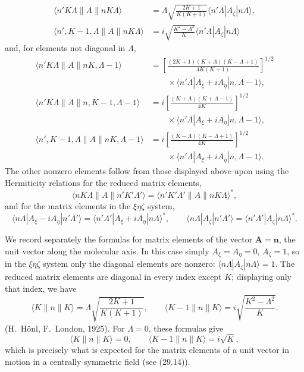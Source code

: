 
\begin{equation}
\begin{split}
\langle n'K\Lambda\|A\|nK\Lambda\rangle&=\Lambda\sqrt{\frac{2K+1}{K(K+1)}}\langle n'\Lambda|A_\zeta|n\Lambda\rangle,\\
\langle n',K-1,\Lambda\|A\|nK\Lambda\rangle&=i\sqrt{\frac{K^2-\Lambda^2}{K}}\langle n'\Lambda|A_\zeta|n\Lambda\rangle
\end{split}
\tag{87.2}
\end{equation}
and, for elements not diagonal in $\Lambda$,
\begin{equation}
\begin{split}
\langle n'K\Lambda\|A\|nK,\Lambda-1\rangle
&=\left[\frac{(2K+1)(K+\Lambda)(K-\Lambda+1)}{4K(K+1)}\right]^{1/2}\\[-2pt]
&\qquad\times\langle n'\Lambda|A_\xi+iA_\eta|n,\Lambda-1\rangle,\\
\langle n'K\Lambda\|A\|n,K-1,\Lambda-1\rangle
&=i\left[\frac{(K+\Lambda)(K+\Lambda-1)}{4K}\right]^{1/2}\\[-2pt]
&\qquad\times\langle n'\Lambda|A_\xi+iA_\eta|n,\Lambda-1\rangle,\\
\langle n',K-1,\Lambda\|A\|nK,\Lambda-1\rangle
&=i\left[\frac{(K-\Lambda)(K-\Lambda+1)}{4K}\right]^{1/2}\\[-2pt]
&\qquad\times\langle n'\Lambda|A_\xi+iA_\eta|n,\Lambda-1\rangle.
\end{split}
\tag{87.3}
\end{equation}
The other nonzero elements follow from those displayed above upon using the Hermiticity relations for the reduced matrix elements,
\[
\langle nK\Lambda\|A\|n'K'\Lambda'\rangle=\langle n'K'\Lambda'\|A\|nK\Lambda\rangle^*,
\]
and for the matrix elements in the $\xi\eta\zeta$ system,
\[
\langle n\Lambda|A_\xi-iA_\eta|n'\Lambda'\rangle=\langle n'\Lambda'|A_\xi+iA_\eta|n\Lambda\rangle^*,\qquad
\langle n\Lambda|A_\zeta|n'\Lambda'\rangle=\langle n'\Lambda'|A_\zeta|n\Lambda\rangle^*.
\]

We record separately the formulas for matrix elements of the vector $\mathbf A=\mathbf n$, the unit vector along the molecular axis. In this case simply $A_\xi=A_\eta=0$, $A_\zeta=1$, so in the $\xi\eta\zeta$ system only the diagonal elements are nonzero: $\langle n\Lambda|A_\zeta|n\Lambda\rangle=1$. The reduced matrix elements are diagonal in every index except $K$; displaying only that index, we have
\begin{equation}
\langle K\|n\|K\rangle=\Lambda\sqrt{\frac{2K+1}{K(K+1)}},\qquad
\langle K-1\|n\|K\rangle=i\sqrt{\frac{K^2-\Lambda^2}{K}}.
\tag{87.4}
\end{equation}
(H.~Hönl, F.~London, 1925). For $\Lambda=0$, these formulas give
\[
\langle K\|n\|K\rangle=0,\qquad \langle K-1\|n\|K\rangle=i\sqrt K,
\]
which is precisely what is expected for the matrix elements of a unit vector in motion in a centrally symmetric field (see (29.14)).


